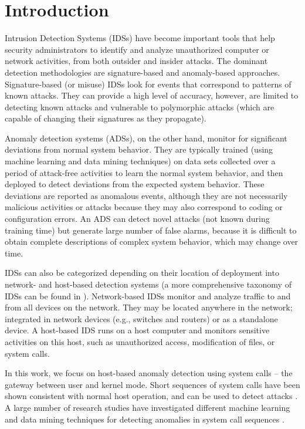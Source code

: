 \chapter{Introduction} \label{chapter1}


Intrusion Detection Systems (IDSs) have become important tools that help security administrators to identify and analyze unauthorized computer or network activities, from both outsider and insider attacks.
The dominant detection methodologies are signature-based and anomaly-based approaches.
Signature-based (or misuse) IDSs look for events that correspond to patterns of known attacks.
They can provide a high level of accuracy, however, are limited to detecting known attacks and vulnerable to polymorphic attacks (which are capable of changing their signatures as they propagate).

Anomaly detection systems (ADSs), on the other hand, monitor for significant deviations from normal system behavior.
They are typically trained (using machine learning and data mining techniques) on data sets collected over a period of attack-free activities to learn the normal system behavior, and then deployed to detect deviations from the expected system behavior.
These deviations are reported as anomalous events, although they are not necessarily malicious activities or attacks because they may also correspond to coding or configuration errors.
An ADS can detect novel attacks (not known during training time) but generate large number of false alarms, because it is difficult to obtain complete descriptions of complex system behavior, which may change over time.

IDSs can also be categorized depending on their location of deployment into network- and host-based detection systems (a more comprehensive taxonomy of IDSs can be found in \cite{Liao2013}).
Network-based IDSs monitor and analyze traffic to and from all devices on the network.
They may be located anywhere in the network; integrated in network devices (e.g., switches and routers) or as a standalone device.
A host-based IDS runs on a host computer and monitors sensitive activities on this host, such as unauthorized access, modification of files, or system calls.

In this work, we focus on host-based anomaly detection using system calls -- the gateway between user and kernel mode.
Short sequences of system calls have been shown consistent with normal host operation, and can be used to detect attacks \cite{Forrest1996,Warrender1999}.
A large number of research studies have investigated different machine learning and data mining techniques for detecting anomalies in system call sequences \cite{Forrest2008, Creech2014, Yolacan2014, Warrender1999}.

